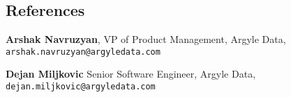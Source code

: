 \documentclass[margin,line,pifont,palatino,courier]{res}
\newenvironment{list1}{
  \begin{list}{\label{}}{%
      \setlength{\itemsep}{0in}
      \setlength{\parsep}{0in} \setlength{\parskip}{0in}
      \setlength{\topsep}{0in} \setlength{\partopsep}{0in}
      \setlength{\leftmargin}{0.0in}}}{\end{list}}
\begin{document}
\begin{resume}
\section{\sc   References}

\begin{list1}
\item {\bf Arshak Navruzyan}, VP of Product Management, Argyle Data, \\
 \texttt{arshak.navruzyan@argyledata.com}

\item {\bf Dejan Miljkovic}  Senior Software Engineer, Argyle Data,\\
 \texttt{dejan.miljkovic@argyledata.com} 
 
\end{list1}


\end{resume}
\end{document}
